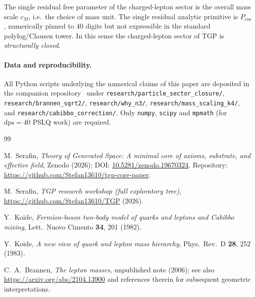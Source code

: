 \documentclass[11pt,a4paper]{article}
\newcommand{\Pcos}{P_{\cos}}
\begin{document}
The single residual free parameter of the charged-lepton sector is the
overall mass scale $c_{M}$, i.e.\ the choice of mass unit. The single
residual analytic primitive is $\Pcos$, numerically pinned to
$40$ digits but not expressible in the standard polylog/Clausen
tower. In this sense the charged-lepton sector of TGP is
\emph{structurally closed}.

\paragraph{Data and reproducibility.}
All Python scripts underlying the numerical claims of this paper are
deposited in the companion repository~\cite{TGP-repo} under
\verb|research/particle_sector_closure/|,
\verb|research/brannen_sqrt2/|, \verb|research/why_n3/|,
\verb|research/mass_scaling_k4/|, and
\verb|research/cabibbo_correction/|. Only \texttt{numpy}, \texttt{scipy}
and \texttt{mpmath} (for $\mathrm{dps}=40$ PSLQ work) are required.

\begin{thebibliography}{99}

M.~Serafin,
\emph{Theory of Generated Space: A minimal core of axioms,
substrate, and effective field},
Zenodo (2026); DOI:
\href{https://doi.org/10.5281/zenodo.19670324}{10.5281/zenodo.19670324}.
Repository: \url{https://github.com/Stefan13610/tgp-core-paper}.

M.~Serafin,
\emph{TGP research workshop (full exploratory tree)},
\url{https://github.com/Stefan13610/TGP} (2026).

Y.~Koide,
\emph{Fermion-boson two-body model of quarks and leptons and Cabibbo mixing},
Lett.\ Nuovo Cimento \textbf{34}, 201 (1982).

Y.~Koide,
\emph{A new view of quark and lepton mass hierarchy},
Phys.\ Rev.\ D \textbf{28}, 252 (1983).

C.~A.~Brannen,
\emph{The lepton masses},
unpublished note (2006); see also
\url{https://arxiv.org/abs/2104.13900} and references therein for
subsequent geometric interpretations.

\end{thebibliography}
\end{document}
